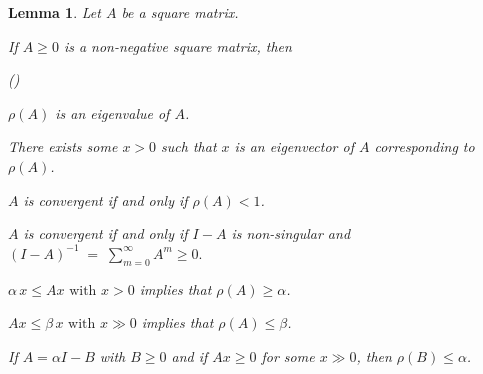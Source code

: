 \documentclass[11pt,fleqn]{article}
\newcounter{llst}
\newenvironment{abet}{\begin{list}{\rm (\alph{llst})}{\usecounter{llst}
		\setlength{\itemindent}{0em} \setlength{\leftmargin}{3em}
		\setlength{\labelwidth}{2em} \setlength{\labelsep}{1em}}}{\end{list}}
\newtheorem{lemma}[theorem]{Lemma}
\begin{document}
\begin{lemma} \label{Fact 1} 
Let $A$ be a square matrix. 
\begin{enumerate}
	\item If $A\geqslant 0$ is a non-negative square matrix, then
	\begin{abet}
		\item $\rho(A)$ is an eigenvalue of $A$.
		\item There exists some $x > 0$ such that $x$ is an eigenvector of $A$ corresponding to $\rho(A)$.
		\item $A$ is convergent if and only if $\rho(A)<1$.
		\item $A$ is convergent if and only if $I-A$ is non-singular and
		$
		(I-A)^{-1} \;=\; \sum_{m=0}^{\infty} A^{m}\geqslant 0.
		$
		\item $\alpha\,x \leqslant Ax \text{ with } x > 0$ implies that $\rho(A)\geqslant \alpha$.
		\item $ Ax \leqslant \beta\, x \text{ with } x\gg 0$ implies that $\rho(A)\leqslant\beta$.
	\end{abet}
	\item If $A = \alpha I - B$ with $B\geqslant 0$ and  if $Ax\geqslant 0$ for some $x\gg 0$, then $\rho(B)\leqslant \alpha$.	
\end{enumerate}
\end{lemma}


\end{document}
